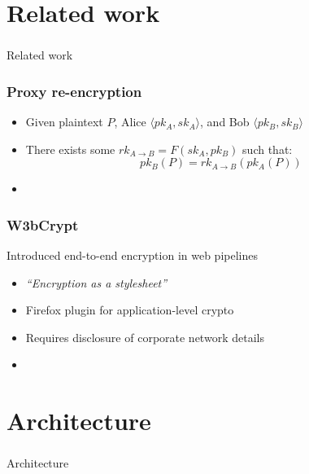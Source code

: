 \documentclass{beamer}
\begin{document}
\section{Related work}
\begin{frame}
\frametitle{}
\begin{center}
Related work
\end{center}
\end{frame}


\begin{frame}
\frametitle{Proxy re-encryption}
\begin{itemize}
\item Given plaintext $P$, Alice $\langle pk_A, sk_A \rangle$, and Bob
$\langle pk_B, sk_B \rangle$
\item There exists some $rk_{A \to B} = F(sk_A, pk_B)$ such that:
\begin{equation*}
pk_B(P) = rk_{A \to B}( pk_A (P))
\end{equation*}
\item \cite{atomic_proxy_reencryption} 
\end{itemize}
\end{frame}

\begin{frame}
\frametitle{W3bCrypt}
Introduced end-to-end encryption in web pipelines
\smallskip
\begin{itemize}
\item \emph{``Encryption as a stylesheet''}
\item Firefox plugin for application-level crypto
\item Requires disclosure of corporate network details
\item \cite{w3bcrypt} 
\end{itemize}
\end{frame}

\section{Architecture}
\begin{frame}
\frametitle{}
\begin{center}
Architecture
\end{center}
\end{frame}
\end{document}

